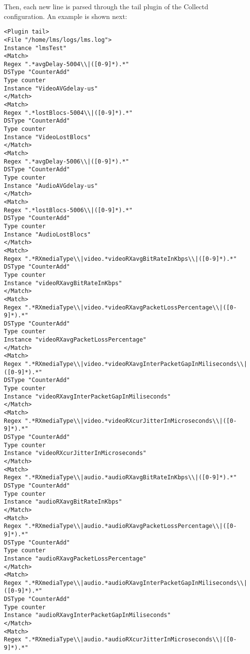 Then, each new line is parsed through the tail plugin of the Collectd configuration. An example is shown next:
\begin{verbatim}
<Plugin tail>
<File "/home/lms/logs/lms.log">
Instance "lmsTest"
<Match>
Regex ".*avgDelay-5004\\|([0-9]*).*"
DSType "CounterAdd"
Type counter
Instance "VideoAVGdelay-us"
</Match>
<Match>
Regex ".*lostBlocs-5004\\|([0-9]*).*"
DSType "CounterAdd"
Type counter
Instance "VideoLostBlocs"
</Match>
<Match>
Regex ".*avgDelay-5006\\|([0-9]*).*"
DSType "CounterAdd"
Type counter
Instance "AudioAVGdelay-us"
</Match>
<Match>
Regex ".*lostBlocs-5006\\|([0-9]*).*"
DSType "CounterAdd"
Type counter
Instance "AudioLostBlocs"
</Match>
<Match>
Regex ".*RXmediaType\\|video.*videoRXavgBitRateInKbps\\|([0-9]*).*"
DSType "CounterAdd"
Type counter
Instance "videoRXavgBitRateInKbps"
</Match>
<Match>
Regex ".*RXmediaType\\|video.*videoRXavgPacketLossPercentage\\|([0-9]*).*"
DSType "CounterAdd"
Type counter
Instance "videoRXavgPacketLossPercentage"
</Match>
<Match>
Regex ".*RXmediaType\\|video.*videoRXavgInterPacketGapInMiliseconds\\|([0-9]*).*"
DSType "CounterAdd"
Type counter
Instance "videoRXavgInterPacketGapInMiliseconds"
</Match>
<Match>
Regex ".*RXmediaType\\|video.*videoRXcurJitterInMicroseconds\\|([0-9]*).*"
DSType "CounterAdd"
Type counter
Instance "videoRXcurJitterInMicroseconds"
</Match>
<Match>
Regex ".*RXmediaType\\|audio.*audioRXavgBitRateInKbps\\|([0-9]*).*"
DSType "CounterAdd"
Type counter
Instance "audioRXavgBitRateInKbps"
</Match>
<Match>
Regex ".*RXmediaType\\|audio.*audioRXavgPacketLossPercentage\\|([0-9]*).*"
DSType "CounterAdd"
Type counter
Instance "audioRXavgPacketLossPercentage"
</Match>
<Match>
Regex ".*RXmediaType\\|audio.*audioRXavgInterPacketGapInMiliseconds\\|([0-9]*).*"
DSType "CounterAdd"
Type counter
Instance "audioRXavgInterPacketGapInMiliseconds"
</Match>
<Match>
Regex ".*RXmediaType\\|audio.*audioRXcurJitterInMicroseconds\\|([0-9]*).*"

\end{verbatim}
